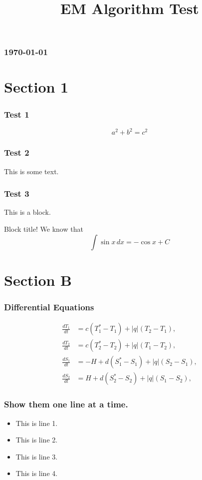 \documentclass[14pt]{beamer}
\title[EM Test]
{EM Algorithm Test}
\begin{document}
\begin{frame}
  \titlepage
\end{frame}


\begin{frame}
  \frametitle{\today}
  \tableofcontents
\end{frame}

\section{Section 1}
\begin{frame}
\frametitle{Test 1}
\[
a^2 + b^2 = c^2
\]
\end{frame}

\begin{frame}
\frametitle{Test 2}
This is some text.

\end{frame}

\begin{frame}
\frametitle{Test 3}
This is a block.

\begin{block}{Block title!}
We know that 
\[\int \sin x \, dx = - \cos x + C
\]
\end{block}

\end{frame}

\section{Section B}
\begin{frame}
\frametitle{Differential Equations}
\begin{equation*}
\begin{split}
\frac{dT_1}{dt} &= c(T_1^* - T_1) + |q| (T_2 - T_1) , \\
\frac{dT_2}{dt} &= c(T_2^* - T_2) + |q| (T_1 - T_2) , \\
\frac{dS_1}{dt} &= -H + d(S_1^* - S_1) + |q| (S_2 - S_1) ,\\
\frac{dS_2}{dt} &= H + d(S_2^* - S_2) + |q| (S_1 - S_2) ,
\end{split}
\end{equation*}
\end{frame}

\begin{frame}
\frametitle{Show them one line at a time.}
\begin{itemize}
\item
This is line 1.
\pause
\item
This is line 2.
\pause
\item
This is line 3.
\pause
\item
This is line 4.
\end{itemize}

\end{frame}
\end{document}
